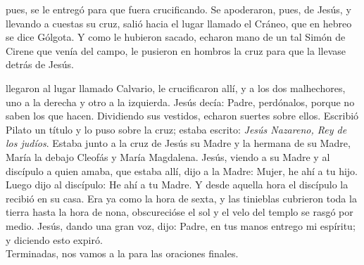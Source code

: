 \documentclass[10pt,twoside]{book}
\begin{document}
\noindent{}
\vspace{2mm}
pues, se le entregó para que fuera crucificando. Se apoderaron, pues, de Jesús, y llevando a cuestas su cruz, 
salió hacia el lugar llamado el Cráneo, que en hebreo se dice Gólgota. Y como le hubieron sacado, echaron mano de un tal Simón de Cirene que venía del campo, 
le pusieron en hombros la cruz para que la llevase detrás de Jesús.\\[2mm]

\vspace{5mm}

\noindent{}
\vspace{2mm}
llegaron al lugar llamado Calvario, le crucificaron allí, y a los dos malhechores, uno a la derecha y otro a la izquierda. 
Jesús decía: Padre, perdónalos, porque no saben los que hacen. Dividiendo sus vestidos, echaron suertes sobre ellos. Escribió Pilato un título y lo puso sobre la cruz;
estaba escrito: \textit{Jesús Nazareno, Rey de los judíos}. Estaba junto a la cruz de Jesús su Madre y la hermana de su Madre, María la debajo Cleofás y María Magdalena.
Jesús, viendo a su Madre y al discípulo a quien amaba, que estaba allí, dijo a la Madre: Mujer, he ahí a tu hijo. Luego dijo al discípulo: He ahí a tu Madre.
Y desde aquella hora el discípulo la recibió en su casa. Era ya como la hora de sexta, y las tinieblas cubrieron toda la tierra hasta la hora de nona,
obscurecióse el sol y el velo del templo se rasgó por medio. Jesús, dando una gran voz, dijo: Padre, en tus manos entrego mi espíritu; y diciendo esto expiró.\\[2mm]
{} Terminadas, nos vamos a la  para las oraciones finales.\\[5mm]
\end{document}
